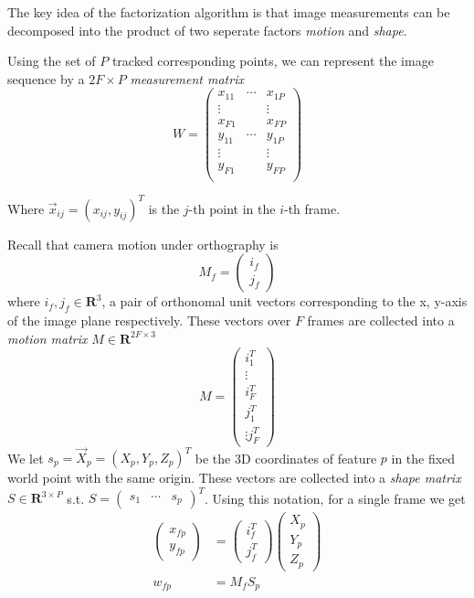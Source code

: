 The key idea of the factorization algorithm is that image measurements
can be decomposed into the product of two seperate factors
\emph{motion} and \emph{shape}. 

Using the set of $P$ tracked corresponding
points, we can represent the image sequence by a $2F\times P$ \emph{measurement matrix
}$$W =
\begin{pmatrix}
  x_{11} & \cdots & x_{1P}\\
  \vdots &  & \vdots \\
  x_{F1} & & x_{FP}\\
  y_{11} & \cdots & y_{1P}\\
  \vdots &  & \vdots \\
  y_{F1} & & y_{FP}\\
\end{pmatrix}
$$

Where $\vec x_{ij} = (x_{ij}, y_{ij})^T$ is the $j$-th point in the
$i$-th frame. 

Recall that camera motion under orthography is $$M_f =
\begin{pmatrix}
  i_f\\
  j_f
\end{pmatrix}
$$ where $i_f, j_f \in \mathbf{R}^{3}$, a pair of orthonomal unit vectors
corresponding to the x, y-axis of the image plane respectively. These vectors over $F$ frames are collected into a
\emph{motion matrix} $M\in \mathbf{R}^{2F \times 3}$ $$M =
\begin{pmatrix}
  i_1^T\\ \vdots \\  i_F^T \\ j_1^T \\ \vdots j_F^T
\end{pmatrix}
$$
We let $s_p = \vec X_p = (X_p, Y_p, Z_p)^T$ be the 3D coordinates of feature $p$ in the fixed world point with the same origin. These vectors are collected into a
\emph{shape matrix} $S\in \mathbf{R}^{3 \times P}$ s.t. $S =
\begin{pmatrix}
  s_1 & \cdots & s_p
\end{pmatrix}^T$. Using this notation, for a single frame we get
\begin{align*}
  \begin{pmatrix}
    x_{fp}\\y_{fp}
  \end{pmatrix} &=
  \begin{pmatrix}
    i_{f}^T\\j_{f}^T
  \end{pmatrix}
  \begin{pmatrix}
    X_p\\ Y_p\\ Z_p
  \end{pmatrix}\\
w_{fp} &= M_fS_p  
\end{align*}

